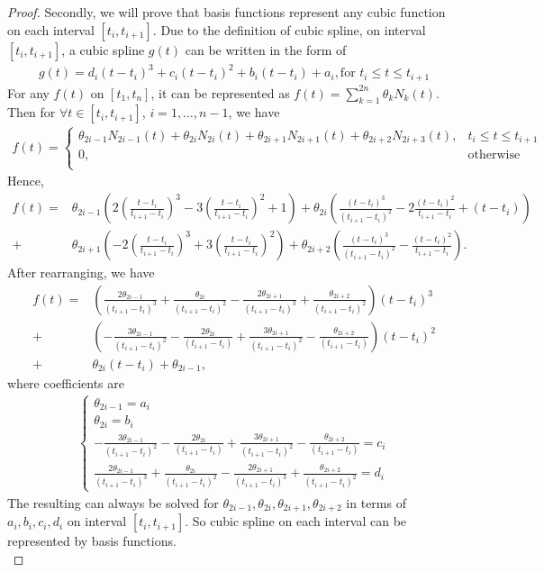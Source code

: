 \begin{proof}
Secondly, we will prove that basis functions represent any cubic function on each interval $[t_i, t_{i+1}]$. Due to the definition of cubic spline, on interval $[t_i, t_{i+1}]$, a cubic spline $g(t)$ can be written in the form of
\begin{eqnarray}
g(t)=d_i (t-t_i)^3+c_i(t-t_i)^2+b_i(t-t_i)+a_i, \mbox{for $t_i \leq t \leq t_{i+1}$}
\end{eqnarray}
For any $f(t)$ on $[t_1, t_n]$, it can be represented as $f(t)=\sum_{k=1}^{2n} \theta_k N_k(t)$. Then for $\forall t \in [t_i,t_{i+1}]$, $i=1,\ldots,n-1$, we have
\begin{align*}
f(t)=\begin{cases}
\theta_{2i-1}N_{2i-1}(t)+\theta_{2i}N_{2i}(t)+\theta_{2i+1}N_{2i+1}(t)+\theta_{2i+2}N_{2i+3}(t), & t_i \leq t \leq t_{i+1}  \\
0, & \mbox{otherwise}\\
\end{cases}
\end{align*}
Hence, 
\begin{align*}
f(t)=&\theta_{2i-1}\left( 2\left(\frac{t-t_{i}}{t_{i+1}-t_{i}}\right)^3-3\left(\frac{t-t_{i}}{t_{i+1}-t_{i}}\right)^2+1  \right) +\theta_{2i} \left( \frac{(t-t_{i})^3}{(t_{i+1}-t_{i})^2}-2\frac{(t-t_{i})^2}{t_{i+1}-t_{i}}+(t-t_{i}) \right) \\
+&\theta_{2i+1} \left( -2\left(\frac{t-t_i}{t_{i+1}-t_i}\right)^3+3\left(\frac{t-t_i}{t_{i+1}-t_i}\right)^2 \right)  +\theta_{2i+2} \left( \frac{(t-t_i)^3}{(t_{i+1}-t_i)^2}-\frac{(t-t_i)^2}{t_{i+1}-t_i} \right).
\end{align*}
After rearranging, we have
\begin{align*}
f(t)=& \left(\frac{2\theta_{2i-1}}{(t_{i+1}-t_{i})^3} +\frac{\theta_{2i}}{(t_{i+1}-t_{i})^2} -\frac{2\theta_{2i+1}}{(t_{i+1}-t_{i})^3} +\frac{\theta_{2i+2}}{(t_{i+1}-t_{i})^2} \right)  (t-t_i)^3 \\
+& \left(-\frac{3\theta_{2i-1}}{(t_{i+1}-t_{i})^2} -\frac{2\theta_{2i}}{(t_{i+1}-t_{i})} +\frac{3\theta_{2i+1}}{(t_{i+1}-t_{i})^2} - \frac{\theta_{2i+2}}{(t_{i+1}-t_{i})}\right)  (t-t_i)^2 \\
+&  \theta_{2i} (t-t_i) +\theta_{2i-1},
\end{align*}
where coefficients are
\begin{align*}
\begin{cases}
\theta_{2i-1}=a_i\\
\theta_{2i}=b_i\\
-\frac{3\theta_{2i-1}}{(t_{i+1}-t_{i})^2} -\frac{2\theta_{2i}}{(t_{i+1}-t_{i})} +\frac{3\theta_{2i+1}}{(t_{i+1}-t_{i})^2} - \frac{\theta_{2i+2}}{(t_{i+1}-t_{i})}=c_i\\
\frac{2\theta_{2i-1}}{(t_{i+1}-t_{i})^3} +\frac{\theta_{2i}}{(t_{i+1}-t_{i})^2} -\frac{2\theta_{2i+1}}{(t_{i+1}-t_{i})^3} +\frac{\theta_{2i+2}}{(t_{i+1}-t_{i})^2}=d_i
\end{cases}
\end{align*}
The resulting can always be solved for $\theta_{2i-1}, \theta_{2i},\theta_{2i+1},\theta_{2i+2}$ in terms of $a_i,b_i,c_i,d_i$ on interval $[t_i, t_{i+1}]$. So cubic spline on each interval can be represented by basis functions. \\


\end{proof}
